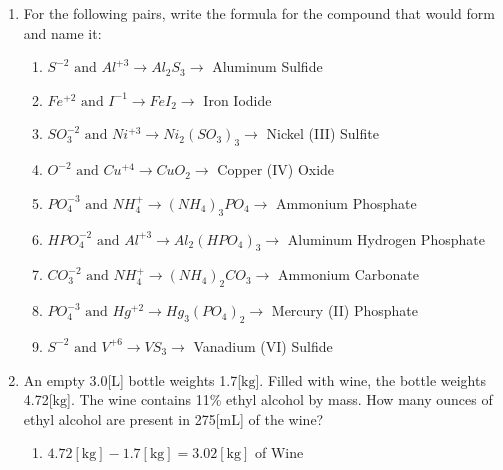 \documentclass[12pt]{article}
\begin{document}
\begin{enumerate}
  \item For the following pairs, write the formula for the compound that would form and name it:
    
    \begin{enumerate}

        \item $S^{-2}\text{ and }Al^{+3} \rightarrow Al_2S_3 \rightarrow$ Aluminum Sulfide 

        \item $Fe^{+2}\text{ and }I^{-1} \rightarrow FeI_2 \rightarrow$ Iron Iodide

        \item $SO_3^{-2}\text{ and }Ni^{+3} \rightarrow Ni_2(SO_3)_3 \rightarrow$ Nickel (III) Sulfite

        \item $O^{-2}\text{ and }Cu^{+4} \rightarrow CuO_2 \rightarrow$ Copper (IV) Oxide

        \item $PO_4^{-3}\text{ and }NH_4^{+} \rightarrow (NH_4)_3PO_4 \rightarrow$ Ammonium Phosphate

        \item $HPO_4^{-2}\text{ and }Al^{+3} \rightarrow Al_2(HPO_4)_3 \rightarrow$ Aluminum Hydrogen Phosphate

        \item $CO_3^{-2}\text{ and }NH_4^{+} \rightarrow (NH_4)_2CO_3 \rightarrow$ Ammonium Carbonate

        \item $PO_4^{-3}\text{ and }Hg^{+2} \rightarrow Hg_3(PO_4)_2 \rightarrow$ Mercury (II) Phosphate

        \item $S^{-2}\text{ and }V^{+6} \rightarrow VS_3 \rightarrow$ Vanadium (VI) Sulfide

    \end{enumerate}

  \item An empty 3.0[$\si{\liter}$] bottle weights 1.7[$\si{\kilo\gram}$]. Filled with wine, the bottle weights 4.72[$\si{\kilo\gram}$]. The wine contains 11\% ethyl alcohol by mass. How many ounces of ethyl alcohol are present in 275[$\si{\milli\liter}$] of the wine? 

    \begin{enumerate}

      \item $4.72[\si{\kilo\gram}]-1.7[\si{\kilo\gram}]=3.02[\si{\kilo\gram}]$ of Wine


\end{enumerate}
\end{enumerate}
\end{document}

